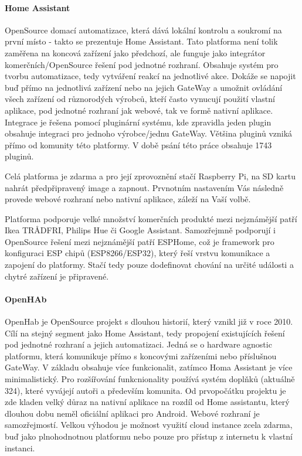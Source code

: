 \documentclass[thesis=B,czech]{FITthesis}[2019/12/23]
\begin{document}
\paragraph{Home Assistant}
OpenSource domací automatizace, která dává lokální kontrolu a soukromí na první místo - takto se prezentuje Home Assistant. Tato platforma není tolik zaměřena na koncová zařízení jako předchozí, ale funguje jako integrátor komerčních/OpenSource řešení pod jednotné rozhraní. Obsahuje systém pro tvorbu automatizace, tedy vytváření reakcí na jednotlivé akce. Dokáže se napojit buď přímo na jednotlivá zařízení nebo na jejich GateWay a umožnit ovládání všech zařízení od různorodých výrobců, kteří často vynucují použití vlastní aplikace, pod jednotné rozhraní jak webové, tak ve formě nativní aplikace. Integrace je řešena pomocí pluginární systému, kde zpravidla jeden plugin obsahuje integraci pro jednoho výrobce/jednu GateWay. Většina pluginů vzniká přímo od komunity této platformy. V době psání této práce obsahuje 1743 pluginů.

Celá platforma je zdarma a pro její zprovoznění stačí Raspberry Pi, na SD kartu nahrát předpřipravený image a zapnout. Prvnotním nastavením Vás následně provede webové rozhraní nebo nativní aplikace, záleží na Vaší volbě. 

Platforma podporuje velké množství komerčních produkté mezi nejznámější patří Ikea TRÅDFRI, Philips Hue či Google Assistant. Samozřejmně podporují i OpenSource řešení mezi nejznámější patří ESPHome, což je framework pro konfiguraci ESP chipů (ESP8266/ESP32), který řeší vrstvu komunikace a zapojení do platformy. Stačí tedy pouze dodefinovat chování na určité události a chytré zařízení je připravené.

\paragraph{OpenHAb}
OpenHab je OpenSource projekt s dlouhou historií, který vznikl již v roce 2010. Cílí na stejný segment jako Home Assistant, tedy  propojení existujících řešení pod jednotné rozhraní a jejich automatizaci. Jedná se o hardware agnostic platformu, která komunikuje přímo s koncovými zařízeními nebo příslušnou GateWay. V základu obsahuje více funkcionalit, zatímco Homa Assistant je více minimalistický. Pro rozšířování funkcnionality používá systém doplňků (aktuálně 324), které vyvájejí autoři a především komunita. Od prvopočátku projektu je zde kladen velký důraz na nativní aplikace na rozdíl od Home assistantu, který dlouhou dobu neměl oficiální aplikaci pro Android. Webové rozhraní je samozřejmostí. Velkou výhodou je možnost využití cloud instance zcela zdarma, buď jako plnohodnotnou platformu nebo pouze pro přístup z internetu k vlastní instanci.
\end{document}
